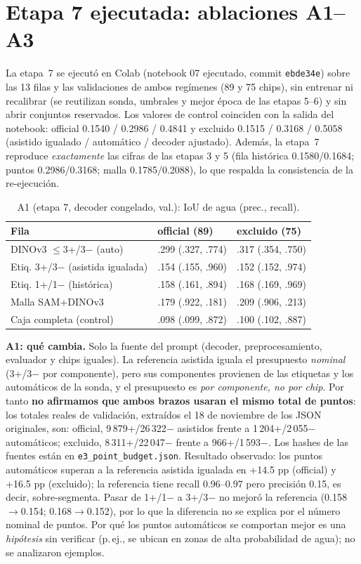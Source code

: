 \documentclass[conference]{IEEEtran}
\begin{document}
\section{Etapa 7 ejecutada: ablaciones A1--A3}
La etapa~7 se ejecut\'o en Colab (notebook 07 ejecutado, commit \texttt{ebde34e}) sobre las 13 filas y las validaciones de ambos reg\'imenes (89 y 75 chips), sin entrenar ni recalibrar (se reutilizan sonda, umbrales y mejor \'epoca de las etapas 5--6) y sin abrir conjuntos reservados. Los valores de control coinciden con la salida del notebook: official 0.1540 / 0.2986 / 0.4841 y excluido 0.1515 / 0.3168 / 0.5058 (asistido igualado / autom\'atico / decoder ajustado). Adem\'as, la etapa~7 reproduce \emph{exactamente} las cifras de las etapas 3 y 5 (fila hist\'orica 0.1580/0.1684; puntos 0.2986/0.3168; malla 0.1785/0.2088), lo que respalda la consistencia de la re-ejecuci\'on.
\begin{table}[!t]\centering\scriptsize\caption{A1 (etapa 7, decoder congelado, val.): IoU de agua (prec., recall).}
\begin{tabular}{@{}p{2.6cm}p{2.5cm}p{2.5cm}@{}}\toprule
Fila & official (89) & excluido (75)\\\midrule
DINOv3 $\le$3+/3$-$ (auto) & .299 (.327, .774) & .317 (.354, .750)\\
Etiq. 3+/3$-$ (asistida igualada) & .154 (.155, .960) & .152 (.152, .974)\\
Etiq. 1+/1$-$ (hist\'orica) & .158 (.161, .894) & .168 (.169, .969)\\
Malla SAM+DINOv3 & .179 (.922, .181) & .209 (.906, .213)\\
Caja completa (control) & .098 (.099, .872) & .100 (.102, .887)\\
\bottomrule\end{tabular}\end{table}
\textbf{A1: qu\'e cambia.} Solo la fuente del prompt (decoder, preprocesamiento, evaluador y chips iguales). La referencia asistida iguala el presupuesto \emph{nominal} (3+/3$-$ por componente), pero sus componentes provienen de las etiquetas y los autom\'aticos de la sonda, y el presupuesto es \emph{por componente, no por chip}. Por tanto \textbf{no afirmamos que ambos brazos usaran el mismo total de puntos}: los totales reales de validación, extraídos el 18 de noviembre de los JSON originales, son: official, 9\,879+/26\,322$-$ asistidos frente a 1\,204+/2\,055$-$ automáticos; excluido, 8\,311+/22\,047$-$ frente a 966+/1\,593$-$. Los hashes de las fuentes están en \texttt{e3\_point\_budget.json}. Resultado observado: los puntos autom\'aticos superan a la referencia asistida igualada en +14.5 pp (official) y +16.5 pp (excluido); la referencia tiene recall 0.96--0.97 pero precisi\'on 0.15, es decir, sobre-segmenta. Pasar de 1+/1$-$ a 3+/3$-$ no mejor\'o la referencia (0.158$\to$0.154; 0.168$\to$0.152), por lo que la diferencia no se explica por el n\'umero nominal de puntos. Por qu\'e los puntos autom\'aticos se comportan mejor es una \emph{hip\'otesis} sin verificar (p.\,ej., se ubican en zonas de alta probabilidad de agua); no se analizaron ejemplos.
\end{document}
